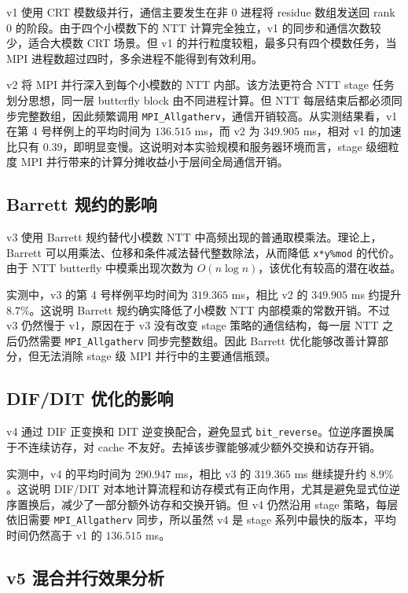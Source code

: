 \documentclass[a4paper]{article}
\begin{document}
v1 使用 CRT 模数级并行，通信主要发生在非 0 进程将 residue 数组发送回 rank 0 的阶段。由于四个小模数下的 NTT 计算完全独立，v1 的同步和通信次数较少，适合大模数 CRT 场景。但 v1 的并行粒度较粗，最多只有四个模数任务，当 MPI 进程数超过四时，多余进程不能得到有效利用。

v2 将 MPI 并行深入到每个小模数的 NTT 内部。该方法更符合 NTT stage 任务划分思想，同一层 butterfly block 由不同进程计算。但 NTT 每层结束后都必须同步完整数组，因此频繁调用 \texttt{MPI\_Allgatherv}，通信开销较高。从实测结果看，v1 在第 4 号样例上的平均时间为 $136.515$ ms，而 v2 为 $349.905$ ms，相对 v1 的加速比只有 $0.39$，即明显变慢。这说明对本实验规模和服务器环境而言，stage 级细粒度 MPI 并行带来的计算分摊收益小于层间全局通信开销。

\subsection{Barrett 规约的影响}

v3 使用 Barrett 规约替代小模数 NTT 中高频出现的普通取模乘法。理论上，Barrett 可以用乘法、位移和条件减法替代整数除法，从而降低 \texttt{x*y\%mod} 的代价。由于 NTT butterfly 中模乘出现次数为 $O(n\log n)$，该优化有较高的潜在收益。

实测中，v3 的第 4 号样例平均时间为 $319.365$ ms，相比 v2 的 $349.905$ ms 约提升 $8.7\%$。这说明 Barrett 规约确实降低了小模数 NTT 内部模乘的常数开销。不过 v3 仍然慢于 v1，原因在于 v3 没有改变 stage 策略的通信结构，每一层 NTT 之后仍然需要 \texttt{MPI\_Allgatherv} 同步完整数组。因此 Barrett 优化能够改善计算部分，但无法消除 stage 级 MPI 并行中的主要通信瓶颈。

\subsection{DIF/DIT 优化的影响}

v4 通过 DIF 正变换和 DIT 逆变换配合，避免显式 \texttt{bit\_reverse}。位逆序置换属于不连续访存，对 cache 不友好。去掉该步骤能够减少额外交换和访存开销。

实测中，v4 的平均时间为 $290.947$ ms，相比 v3 的 $319.365$ ms 继续提升约 $8.9\%$。这说明 DIF/DIT 对本地计算流程和访存模式有正向作用，尤其是避免显式位逆序置换后，减少了一部分额外访存和交换开销。但 v4 仍然沿用 stage 策略，每层依旧需要 \texttt{MPI\_Allgatherv} 同步，所以虽然 v4 是 stage 系列中最快的版本，平均时间仍然高于 v1 的 $136.515$ ms。

\subsection{v5 混合并行效果分析}
\end{document}

